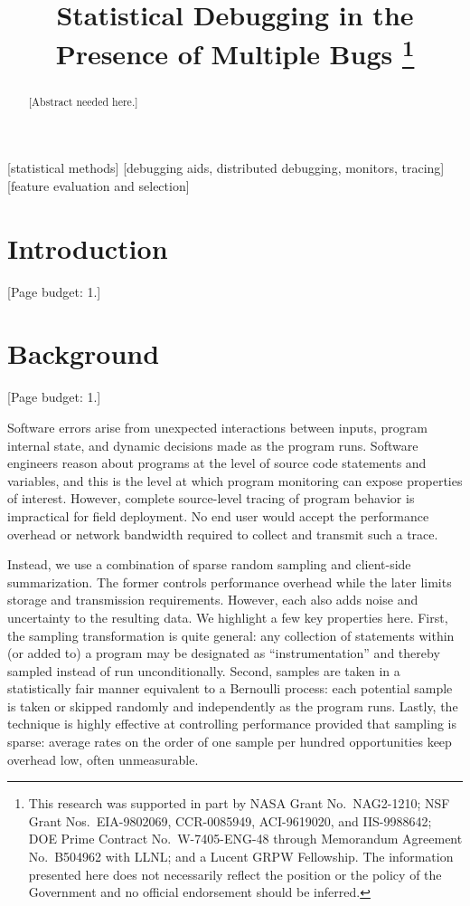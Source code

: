 \documentclass{acm_proc_article-sp}
\title{Statistical Debugging in the Presence of Multiple Bugs
  \thanks{This research was supported in part by NASA Grant No.\ 
    NAG2-1210; NSF Grant Nos.\ EIA-9802069, CCR-0085949, ACI-9619020,
    and IIS-9988642; DOE Prime Contract No.\ W-7405-ENG-48 through
    Memorandum Agreement No.\ B504962 with LLNL; and a Lucent GRPW
    Fellowship.  The information presented here does not necessarily
    reflect the position or the policy of the Government and no
    official endorsement should be inferred.}}
\author{
  \alignauthor Ben Liblit \eecs \\
  \alignauthor Mayur Naik \stan \\
  \alignauthor Alice X.\ Zheng \eecs \\
  \moreauthors
  \global\multiply\auwidth by 3
  \global\divide\auwidth by 2
  \alignauthor Alex Aiken \stan \\
  \alignauthor Michael I.\ Jordan \both
  \moreauthors
  \alignauthor
  \affaddr{\eecs Department of Electrical \\ Engineering and Computer Science} \\
  \affaddr{\stat Department of Statistics} \\
  \affaddr{University of California, Berkeley} \\
  \affaddr{Berkeley, CA 94720-1776}
  \alignauthor
  \affaddr{\stan Computer Science Department} \\
  \affaddr{353 Serra Mall} \\
  \affaddr{Stanford University} \\
  \affaddr{Stanford CA 94305-9025}
}
\newcommand{\placeholder}[1]{{\color[cmyk]{0,0.61,0.87,0}[#1]}}
\begin{document}
\CopyrightYear{2004}
\maketitle

\begin{abstract}
\placeholder{Abstract needed here.}
\end{abstract}

[statistical methods]
[debugging aids, distributed debugging, monitors, tracing]
[feature
  evaluation and selection]




\section{Introduction}
\label{sec:introduction}

\placeholder{Page budget: 1.}


\section{Background}
\label{sec:background}

\placeholder{Page budget: 1.}

Software errors arise from unexpected interactions between inputs,
program internal state, and dynamic decisions made as the program
runs.  Software engineers reason about programs at the level of source
code statements and variables, and this is the level at which program
monitoring can expose properties of interest.  However, complete
source-level tracing of program behavior is impractical for field
deployment.  No end user would accept the performance overhead or
network bandwidth required to collect and transmit such a trace.

Instead, we use a combination of sparse random sampling and
client-side summarization.  The former controls performance overhead
while the later limits storage and transmission requirements.
However, each also adds noise and uncertainty to the resulting data.
We highlight a few key properties here.  First, the sampling
transformation is quite general: any collection of statements within
(or added to) a program may be designated as ``instrumentation'' and
thereby sampled instead of run unconditionally.  Second, samples are
taken in a statistically fair manner equivalent to a Bernoulli
process: each potential sample is taken or skipped randomly and
independently as the program runs.  Lastly, the technique is highly
effective at controlling performance provided that sampling is sparse:
average rates on the order of one sample per hundred opportunities
keep overhead low, often unmeasurable.
\end{document}
